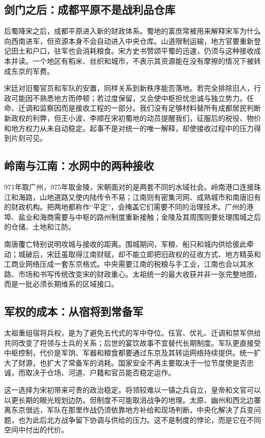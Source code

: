 \subsection{剑门之后：成都平原不是战利品仓库}

后蜀降宋之后，成都平原进入新的财政体系。蜀地的富庶常被用来解释宋军为什么向西南进军，但资源本身不会自动进入中央仓库。山道限制运输，地方官要重新登记田土和户口，驻军也会消耗粮食。宋方史书赞颂平蜀的迅速，仍须与这种接收成本并读。一个地区有稻米、丝织和城市，不表示其资源能在没有摩擦的情况下被转成东京的军费。

宋廷对旧蜀官员和军队的安置，同样关系到新秩序能否落地。若完全排除旧人，行政可能因不熟悉地方而停顿；若过度保留，又会使中枢担忧忠诚与独立势力。任命、迁调和监察因而是接收工程的一部分。我们没有足够材料替所有成都居民判断新政权的利弊，但王小波、李顺在宋初蜀地的动员提醒我们，征服后的税役、物价和地方权力从未自动稳定。起事不是对统一的唯一解释，却使接收过程中的压力得到片刻可见。

\subsection{岭南与江南：水网中的两种接收}

971年取广州，975年取金陵，宋朝面对的是两套不同的水域社会。岭南港口连接珠江和海路，山地道路又使内陆传令不易；江南则有密集河网、成熟城市和南唐旧有的财政机构。把两地都称作“平定”，会掩盖它们需要不同的治理技术。广州的港埠、盐业和海商需要与中枢的路州制度重新接触；金陵及其周围则要处理围城之后的仓储、土地和江防。

南唐覆亡特别说明攻城与接收的距离。围城期间，军粮、船只和城内供给彼此牵动；城破后，宋廷虽取得江南财赋，却不能立即把旧政权的征收方式、地方精英和工商业网络压成一套东京格式。中央需要江南的税粮与手工业，江南也会以其水路、市场和书写传统改变宋的财政重心。太祖统一的最大收获并非一张完整地图，而是一批必须长期维系的区域接口。

\subsection{军权的成本：从宿将到常备军}

太祖重组宿将兵权，是为了避免五代式的军中夺位。任官、优礼、迁调和禁军供给共同改变了将领与士兵的关系；后世的宴饮故事不宜替代长期制度。军队更直接受中枢控制，代价是军饷、军器和粮食都要通过东京及其转运网络持续提供。统一扩大了财源，也扩大了常备军的消耗。国家安全不再主要取决于一位节度使是否忠诚，而取决于仓场、河道、户籍和官员能否稳定运作。

这一选择为宋初带来可贵的政治稳定。将领较难以一镇之兵自立，皇帝和文官可以以更长期的眼光规划边防。但制度不可能取消战争的地理。太原、幽州和西北边寨离东京很远，军队在那里作战仍须依靠地方补给和现场判断。中央化解决了兵变问题，也为此后北方战争留下协调与供给的压力。这不是制度的悖论，而是它在不同空间中付出的代价。

